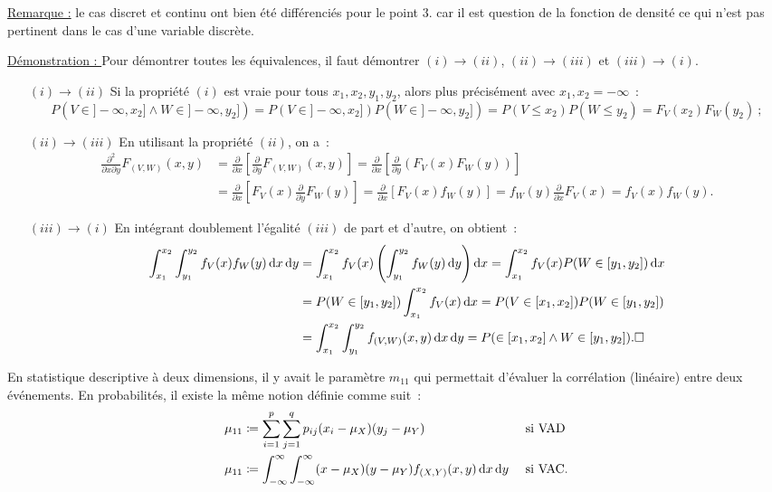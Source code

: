 \documentclass{article}
\renewcommand{\pd}[1]{\frac {\partial}{\partial #1}}
\begin{document}
			\underline{Remarque :} le cas discret et continu ont bien été différenciés pour le point $3.$ car il est question de la fonction de densité ce qui n'est pas
			pertinent dans le cas d'une variable discrète.

			\underline{Démonstration : } Pour démontrer toutes les équivalences, il faut démontrer $(i) \rightarrow (ii)$, $(ii) \rightarrow (iii)$ et
			$(iii) \rightarrow (i)$.

			\begin{itemize}
				\item[$(i) \rightarrow (ii)$] Si la propriété $(i)$ est vraie pour tous $x_1, x_2, y_1, y_2$, alors plus précisément avec $x_1, x_2 = -\infty$~:
				\[P(V \in ]-\infty, x_2] \land W \in ]-\infty, y_2]) = P(V \in ]-\infty, x_2])P(W \in ]-\infty, y_2]) = P(V \leq x_2)P(W \leq y_2) = F_V(x_2)F_W(y_2)~;\]
				\item[$(ii) \rightarrow (iii)$] En utilisant la propriété $(ii)$, on a~:
				\begin{align*}
					\frac {\partial^2}{\partial x \partial y}F_{(V, W)}(x, y) &= \pd{x}\left[\pd{y}F_{(V, W)}(x, y)\right]
						= \pd{x}\left[\pd{y}\left(F_V(x)F_W(y)\right)\right] \\
					&= \pd{x}\left[F_V(x)\pd{y}F_W(y)\right] = \pd{x}[F_V(x)f_W(y)] = f_W(y)\pd{x}F_V(x) = f_V(x)f_W(y).
				\end{align*}

				\item[$(iii) \rightarrow (i)$] En intégrant doublement l'égalité $(iii)$ de part et d'autre, on obtient~:
				\begin{align*}
					\int_{x_1}^{x_2}\int_{y_1}^{y_2}f_V(x)f_W(y)\dif x\dif y &= \int_{x_1}^{x_2}f_V(x)\left(\int_{y_1}^{y_2}f_W(y) \dif y\right)\dif x
						= \int_{x_1}^{x_2}f_V(x)P(W \in [y_1, y_2])\dif x \\
					&= P(W \in [y_1, y_2])\int_{x_1}^{x_2}f_V(x)\dif x = P(V \in [x_1, x_2])P(W \in [y_1, y_2]) \\
					&= \int_{x_1}^{x_2}\int_{y_1}^{y_2}f_{(V, W)}(x, y)\dif x\dif y = P( \in [x_1, x_2] \land W \in [y_1, y_2]). \square
				\end{align*}
			\end{itemize}

			En statistique descriptive à deux dimensions, il y avait le paramètre $m_{11}$ qui permettait d'évaluer la corrélation (linéaire) entre deux événements.
			En probabilités, il existe la même notion définie comme suit~:
			\begin{align*}
				\mu_{11} &\coloneqq \sum_{i=1}^p\sum_{j=1}^qp_{ij}(x_i-\mu_X)(y_j-\mu_Y) \;\;\;\;&&\text{ si VAD}\\
				\mu_{11} &\coloneqq \int_{-\infty}^\infty\int_{-\infty}^\infty(x-\mu_X)(y-\mu_Y)f_{(X, Y)}(x, y)\dif x\dif y &&\text{ si VAC}.
			\end{align*}
\end{document}
